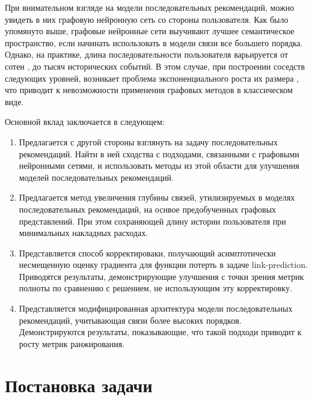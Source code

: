\documentclass{article}
\begin{document}
При внимательном взгляде на модели последовательных рекомендаций, можно увидеть в них графовую нейронную
сеть со стороны пользователя. Как было упомянуто выше, графовые нейронные сети выучивают лучшее 
семантическое пространство, если начинать использовать в модели связи все большего порядка. Однако, на практике,
длина последовательности пользователя варьируется от сотен \cite{sasrec,yandex}, до тысяч \cite{pinnerformer,transact}
исторических событий. В этом случае, при построении соседств следующих уровней, возникает проблема
экспоненциального роста их размера \cite{sage}, что приводит к невозможности применения графовых методов 
в классическом виде.

Основной вклад заключается в следующем:

\begin{enumerate}
	\item[\textbullet] Предлагается с другой стороны взглянуть на задачу последовательных рекомендаций. Найти в ней сходства с подходами, связанными с графовыми
нейронными сетями, и использовать методы из этой области для улучшения моделей последовательных рекомендаций.
	\item[\textbullet] Предлагается метод увеличения глубины связей, утилизируемых в моделях последовательных рекомендаций, на оснвое 
предобученных графовых представлений. При этом сохраняющей длину истории пользователя при минимальных накладных расходах.
	\item[\textbullet] Представляется способ корректироваки, получающий асимптотически несмещенную оценку градиента для функции потерть в задаче link-prediction. 
Приводятся результаты, демонстрирующие улучшения с точки зрения метрик полноты по сравнению с решением, не использующим эту корректировку.
	\item[\textbullet] Представляется модифицированная архитектура модели последовательных рекомендаций, учитывающая связи более высоких порядков. Демонстрируются
результаты, показывающие, что такой подходи приводит к росту метрик ранжирования. 
\end{enumerate}
 

\section{Постановка задачи}
\end{document}
